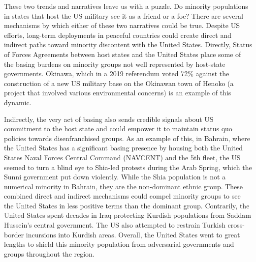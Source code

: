 These two trends and narratives leave us with a puzzle. Do minority populations in states that host the US military see it as a friend or a foe? There are several mechanisms by which either of these two narratives could be true. Despite US efforts, long-term deployments in peaceful countries could create direct and indirect paths toward minority discontent with the United States. Directly, Status of Forces Agreements between host states and the United States place some of the basing burdens on minority groups not well represented by host-state governments. Okinawa, which in a 2019 referendum voted 72\% against the construction of a new US military base on the Okinawan town of Henoko (a project that involved various environmental concerns) is an example of this dynamic.\cite{tokyoone20200427,McCurry2019}


Indirectly, the very act of basing also sends credible signals about US commitment to the host state and could empower it to maintain status quo policies towards disenfranchised groups. As an example of this, in Bahrain, where the United States has a significant basing presence by housing both the United States Naval Forces Central Command (NAVCENT) and the 5th fleet, the US seemed to turn a blind eye to Shia-led protests during the Arab Spring, which the Sunni government put down violently.\cite{McDaniel2013} While the Shia population is not a numerical minority in Bahrain, they are the non-dominant ethnic group. These combined direct and indirect mechanisms could compel minority groups to see the United States in less positive terms than the dominant group. Contrarily, the United States spent decades in Iraq protecting Kurdish populations from Saddam Hussein's central government. The US also attempted to restrain Turkish cross-border incursions into Kurdish areas. Overall, the United States went to great lengths to shield this minority population from adversarial governments and groups throughout the region. 

